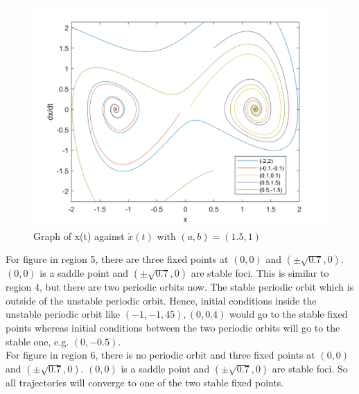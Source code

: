 \documentclass[10pt]{article}
\begin{document}
\begin{figure}[H]
\begin{minipage}[b]{0.5\linewidth}
            \includegraphics[width=\textwidth]{Files/q6,region6.png}
            \caption{Graph of x(t) against $\dot{x}(t)$ with $(a,b)=(1.5,1)$}
        \end{minipage}
\end{figure}
\noindent For figure in region 5, there are three fixed points at $(0,0)$ and $(\pm\sqrt{0.7},0)$. $(0,0)$ is a saddle point and $(\pm\sqrt{0.7},0)$ are stable foci. This is similar to region 4, but there are two periodic orbits now. The stable periodic orbit which is outside of the unstable periodic orbit. Hence, initial conditions inside the unstable periodic orbit like $(-1,-1,45),(0,0.4)$ would go to the stable fixed points whereas initial conditions between the two periodic orbits will go to the stable one, e.g. $(0,-0.5)$.\\
For figure in region 6, there is no periodic orbit and three fixed points at $(0,0)$ and $(\pm\sqrt{0.7},0)$. $(0,0)$ is a saddle point and $(\pm\sqrt{0.7},0)$ are stable foci. So all trajectories will converge to one of the two stable fixed points.
\end{document}
